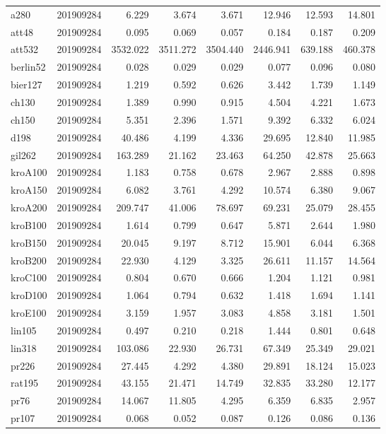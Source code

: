 \begin{center}
\begin{longtable}{llrrrrrr}
a280 & 201909284 &6.229 & 3.674 & 3.671 & 12.946 & 12.593 & 14.801\\
att48 & 201909284 & 0.095 & 0.069 & 0.057 & 0.184 & 0.187 & 0.209\\
att532 & 201909284 & 3532.022 & 3511.272 & 3504.440 & 2446.941 & 639.188 & 460.378\\
berlin52 & 201909284 & 0.028 & 0.029 & 0.029 & 0.077 & 0.096 & 0.080\\
bier127 & 201909284 & 1.219 & 0.592 & 0.626 & 3.442 & 1.739 & 1.149\\
ch130 & 201909284 & 1.389 & 0.990 & 0.915 & 4.504 & 4.221 & 1.673\\
ch150 & 201909284 & 5.351 & 2.396 & 1.571 & 9.392 & 6.332 & 6.024\\
d198 & 201909284 & 40.486 & 4.199 & 4.336 & 29.695 & 12.840 & 11.985\\
gil262 & 201909284 & 163.289 & 21.162 & 23.463 & 64.250 & 42.878 & 25.663\\
kroA100 & 201909284 & 1.183 & 0.758 & 0.678 & 2.967 & 2.888 & 0.898\\
kroA150 & 201909284 & 6.082 & 3.761 & 4.292 & 10.574 & 6.380 & 9.067\\
kroA200 & 201909284 & 209.747 & 41.006 & 78.697 & 69.231 & 25.079 & 28.455\\
kroB100 & 201909284 & 1.614 & 0.799 & 0.647 & 5.871 & 2.644 & 1.980\\
kroB150 & 201909284 & 20.045 & 9.197 & 8.712 & 15.901 & 6.044 & 6.368\\
kroB200 & 201909284 & 22.930 & 4.129 & 3.325 & 26.611 & 11.157 & 14.564\\
kroC100 & 201909284 & 0.804 & 0.670 & 0.666 & 1.204 & 1.121 & 0.981\\
kroD100 & 201909284 & 1.064 & 0.794 & 0.632 & 1.418 & 1.694 & 1.141\\
kroE100 & 201909284 & 3.159 & 1.957 & 3.083 & 4.858 & 3.181 & 1.501\\
lin105 & 201909284 & 0.497 & 0.210 & 0.218 & 1.444 & 0.801 & 0.648\\
lin318 & 201909284 & 103.086 & 22.930 & 26.731 & 67.349 & 25.349 & 29.021\\
pr226 & 201909284  & 27.445 & 4.292 & 4.380 & 29.891 & 18.124 & 15.023\\
rat195 & 201909284 & 43.155 & 21.471 & 14.749 & 32.835 & 33.280 & 12.177\\
pr76 & 201909284 & 14.067 & 11.805 & 4.295 & 6.359 & 6.835 & 2.957\\
pr107 & 201909284 & 0.068 & 0.052 & 0.087 & 0.126 & 0.086 & 0.136\\

\end{longtable}
\end{center}
